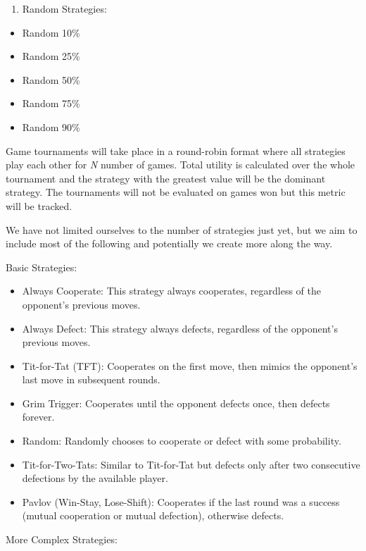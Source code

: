 \documentclass[11pt,preprint]{elsarticle}
\numberwithin{equation}{section}
\numberwithin{figure}{section}
\numberwithin{table}{section}
\def\tightlist{} %
\begin{document}
\begin{enumerate}
\def\labelenumi{\arabic{enumi}.}
\setcounter{enumi}{6}
\tightlist
\item
  Random Strategies:
\end{enumerate}

\begin{itemize}
\tightlist
\item
  Random 10\%
\item
  Random 25\%
\item
  Random 50\%
\item
  Random 75\%
\item
  Random 90\%
\end{itemize}

Game tournaments will take place in a round-robin format where all
strategies play each other for \emph{N} number of games. Total utility
is calculated over the whole tournament and the strategy with the
greatest value will be the dominant strategy. The tournaments will not
be evaluated on games won but this metric will be tracked.

We have not limited ourselves to the number of strategies just yet, but
we aim to include most of the following and potentially we create more
along the way.

Basic Strategies:

\begin{itemize}
\item
  Always Cooperate: This strategy always cooperates, regardless of the
  opponent's previous moves.
\item
  Always Defect: This strategy always defects, regardless of the
  opponent's previous moves.
\item
  Tit-for-Tat (TFT): Cooperates on the first move, then mimics the
  opponent's last move in subsequent rounds.
\item
  Grim Trigger: Cooperates until the opponent defects once, then defects
  forever.
\item
  Random: Randomly chooses to cooperate or defect with some probability.
\item
  Tit-for-Two-Tats: Similar to Tit-for-Tat but defects only after two
  consecutive defections by the available player.
\item
  Pavlov (Win-Stay, Lose-Shift): Cooperates if the last round was a
  success (mutual cooperation or mutual defection), otherwise defects.
\end{itemize}

More Complex Strategies:
\end{document}

